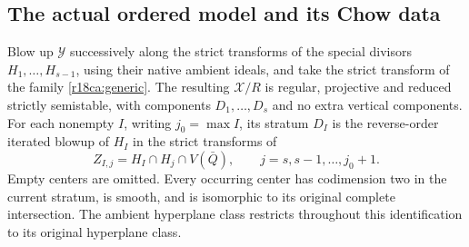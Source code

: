 \subsection{The actual ordered model and its Chow data}

\begin{lemma}
\label{r18ca:model}
Blow up $\mathcal Y$ successively along the strict transforms
of the special divisors $H_1,\ldots,H_{s-1}$, using their
native ambient ideals, and take the strict transform of the
family \eqref{r18ca:generic}.  The resulting $\mathcal X/R$
is regular, projective and reduced strictly semistable, with
components $D_1,\ldots,D_s$ and no extra vertical components.
For each nonempty $I$, writing $j_0=\max I$, its stratum
$D_I$ is the reverse-order iterated blowup of $H_I$ in
the strict transforms of
\[
        Z_{I,j}=H_I\cap H_j\cap V(\bar Q),
                 \qquad j=s,s-1,\ldots,j_0+1.
 \tag{CA18.3}\label{r18ca:centers}
\]
Empty centers are omitted.  Every occurring center has
codimension two in the current stratum, is smooth, and
is isomorphic to its original complete intersection.
The ambient hyperplane class restricts throughout this
identification to its original hyperplane class.
\end{lemma}

